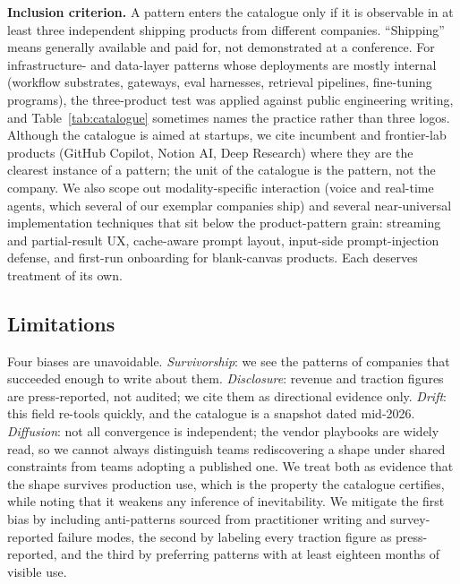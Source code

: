 \documentclass[11pt]{article}
\begin{document}
\textbf{Inclusion criterion.} A pattern enters the catalogue only if it is
observable in at least three independent shipping products from different
companies. ``Shipping'' means generally available and paid for, not
demonstrated at a conference. For infrastructure- and data-layer patterns
whose deployments are mostly internal (workflow substrates, gateways, eval
harnesses, retrieval pipelines, fine-tuning programs), the three-product test
was applied against public engineering writing, and Table~\ref{tab:catalogue}
sometimes names the practice rather than three logos. Although the catalogue
is aimed at startups, we cite incumbent and frontier-lab products (GitHub
Copilot, Notion AI, Deep Research) where they are the clearest instance of a
pattern; the unit of the catalogue is the pattern, not the company. We also
scope out modality-specific interaction (voice and real-time agents, which
several of our exemplar companies ship) and several near-universal
implementation techniques that sit below the product-pattern grain: streaming
and partial-result UX, cache-aware prompt layout, input-side prompt-injection
defense, and first-run onboarding for blank-canvas products. Each deserves
treatment of its own.

\subsection{Limitations}
\label{sec:limitations}

Four biases are unavoidable. \emph{Survivorship}: we see
the patterns of companies that succeeded enough to write about them.
\emph{Disclosure}: revenue and traction figures are press-reported, not
audited; we cite them as directional evidence only. \emph{Drift}: this field
re-tools quickly, and the catalogue is a snapshot dated mid-2026.
\emph{Diffusion}: not all convergence is independent; the vendor playbooks
\citep{anthropic2024agents, openai2025agentsguide} are widely read, so we
cannot always distinguish teams rediscovering a shape under shared
constraints from teams adopting a published one. We treat both as evidence
that the shape survives production use, which is the property the catalogue
certifies, while noting that it weakens any inference of inevitability. We
mitigate the first bias by including anti-patterns sourced from practitioner
writing and survey-reported failure modes, the second by labeling every
traction figure as press-reported, and the third by preferring patterns with
at least eighteen months of visible use.
\end{document}
